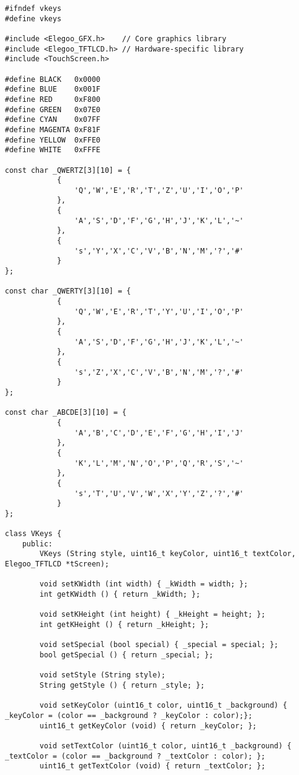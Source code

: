 \documentclass[a4paper, 11pt]{scrartcl}
\begin{document}
\begin{lstlisting}
#ifndef vkeys
#define vkeys

#include <Elegoo_GFX.h>    // Core graphics library
#include <Elegoo_TFTLCD.h> // Hardware-specific library
#include <TouchScreen.h>

#define	BLACK   0x0000
#define	BLUE    0x001F
#define	RED     0xF800
#define	GREEN   0x07E0
#define CYAN    0x07FF
#define MAGENTA 0xF81F
#define YELLOW  0xFFE0
#define WHITE   0xFFFE

const char _QWERTZ[3][10] = {
            {
                'Q','W','E','R','T','Z','U','I','O','P'
            },
            {
                'A','S','D','F','G','H','J','K','L','~'
            },
            {
                's','Y','X','C','V','B','N','M','?','#'
            }
};

const char _QWERTY[3][10] = {
            {
                'Q','W','E','R','T','Y','U','I','O','P'
            },
            {
                'A','S','D','F','G','H','J','K','L','~'
            },
            {
                's','Z','X','C','V','B','N','M','?','#'
            }
};

const char _ABCDE[3][10] = {
            {
                'A','B','C','D','E','F','G','H','I','J'
            },
            {
                'K','L','M','N','O','P','Q','R','S','~'
            },
            {
                's','T','U','V','W','X','Y','Z','?','#'
            }
};

class VKeys {
    public:
        VKeys (String style, uint16_t keyColor, uint16_t textColor, Elegoo_TFTLCD *tScreen);
        
        void setKWidth (int width) { _kWidth = width; };
        int getKWidth () { return _kWidth; };

        void setKHeight (int height) { _kHeight = height; };
        int getKHeight () { return _kHeight; };

        void setSpecial (bool special) { _special = special; };
        bool getSpecial () { return _special; };

        void setStyle (String style);
        String getStyle () { return _style; };

        void setKeyColor (uint16_t color, uint16_t _background) { _keyColor = (color == _background ? _keyColor : color);};
        uint16_t getKeyColor (void) { return _keyColor; };

        void setTextColor (uint16_t color, uint16_t _background) { _textColor = (color == _background ? _textColor : color); };
        uint16_t getTextColor (void) { return _textColor; };


\end{lstlisting}
\end{document}
